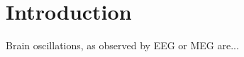 \section{Introduction}
Brain oscillations, as observed by EEG or MEG are... \cite{Medendorp2008} \cite{Davis2012} \cite{VanWijk2012}